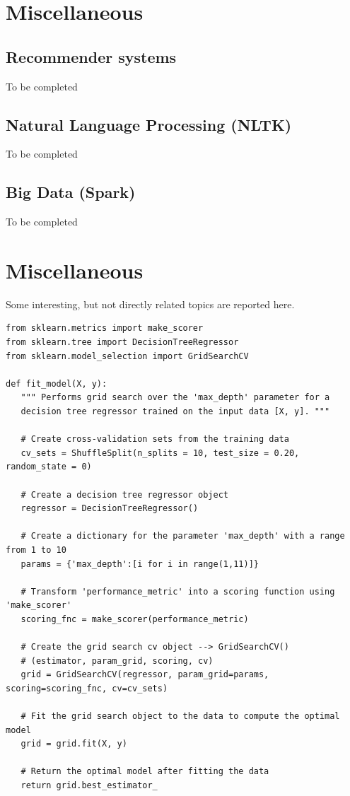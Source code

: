 \documentclass[11pt]{article}
\begin{document}
\section{Miscellaneous}

\subsection{Recommender systems}
To be completed
\subsection{Natural Language Processing (NLTK)}
To be completed
\subsection{Big Data (Spark)}
To be completed


\clearpage
\appendix
\section{Miscellaneous}\label{sec:app1}
Some interesting, but not directly related topics are reported here.

\begin{lstlisting}
from sklearn.metrics import make_scorer
from sklearn.tree import DecisionTreeRegressor
from sklearn.model_selection import GridSearchCV

def fit_model(X, y):
   """ Performs grid search over the 'max_depth' parameter for a 
   decision tree regressor trained on the input data [X, y]. """

   # Create cross-validation sets from the training data
   cv_sets = ShuffleSplit(n_splits = 10, test_size = 0.20, random_state = 0)

   # Create a decision tree regressor object
   regressor = DecisionTreeRegressor()

   # Create a dictionary for the parameter 'max_depth' with a range from 1 to 10
   params = {'max_depth':[i for i in range(1,11)]}

   # Transform 'performance_metric' into a scoring function using 'make_scorer' 
   scoring_fnc = make_scorer(performance_metric)

   # Create the grid search cv object --> GridSearchCV()
   # (estimator, param_grid, scoring, cv) 
   grid = GridSearchCV(regressor, param_grid=params, scoring=scoring_fnc, cv=cv_sets)

   # Fit the grid search object to the data to compute the optimal model
   grid = grid.fit(X, y)

   # Return the optimal model after fitting the data
   return grid.best_estimator_
\end{lstlisting}
\end{document}
